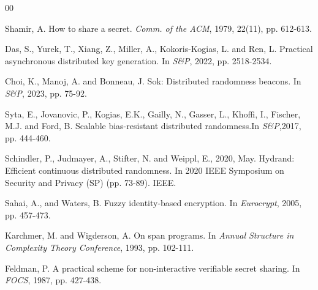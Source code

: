 \documentclass[runningheads]{llncs}
\begin{document}

\begin{thebibliography}{00}

 Shamir, A. How to share a secret. \textit{Comm. of the ACM}, 1979, 22(11), pp. 612-613.

Das, S., Yurek, T., Xiang, Z., Miller, A., Kokoris-Kogias, L. and Ren, L. Practical asynchronous distributed key generation. In \textit{S\&P}, 2022, pp. 2518-2534.

Choi, K., Manoj, A. and Bonneau, J. Sok: Distributed randomness beacons. In \textit{S\&P}, 2023, pp. 75-92.

Syta, E., Jovanovic, P., Kogias, E.K., Gailly, N., Gasser, L., Khoffi, I., Fischer, M.J. and Ford, B. Scalable bias-resistant distributed randomness.In \textit{S\&P},2017, pp. 444-460.

Schindler, P., Judmayer, A., Stifter, N. and Weippl, E., 2020, May. Hydrand: Efficient continuous distributed randomness. In 2020 IEEE Symposium on Security and Privacy (SP) (pp. 73-89). IEEE.



 Sahai, A., and Waters, B. Fuzzy identity-based encryption. In \textit{Eurocrypt}, 2005, pp. 457-473.








Karchmer, M. and Wigderson, A. On span programs. In \textit{Annual Structure in Complexity Theory Conference}, 1993, pp. 102-111.


 Feldman, P. A practical scheme for non-interactive verifiable secret sharing. In \textit{FOCS}, 1987, pp. 427-438.



\end{thebibliography}
\end{document}
